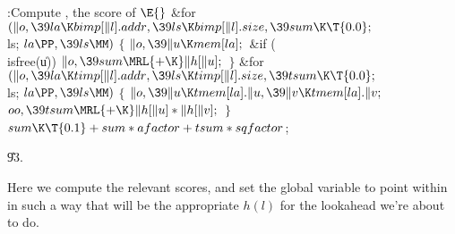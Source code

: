 \B{}:Compute , the score of \X${}%
\E{}$\6
\&{for} ${}(\|o,\39\\{la}\K\\{bimp}[\|l].\\{addr},\39\\{ls}\K\\{bimp}[\|l].%
\\{size},\39\\{sum}\K\T{0.0};{}$ \\{ls}; ${}\\{la}\PP,\39\\{ls}\MM){}$\5
${}\{{}$\1\6
${}\|o,\39\|u\K\\{mem}[\\{la}];{}$\6
\&{if} (\\{isfree}(\|u))\1\5
${}\|o,\39\\{sum}\MRL{+{\K}}\|h[\|u];{}$\2\6
\4${}\}{}$\2\6
\&{for} ${}(\|o,\39\\{la}\K\\{timp}[\|l].\\{addr},\39\\{ls}\K\\{timp}[\|l].%
\\{size},\39\\{tsum}\K\T{0.0};{}$ \\{ls}; ${}\\{la}\PP,\39\\{ls}\MM){}$\5
${}\{{}$\1\6
${}\|o,\39\|u\K\\{tmem}[\\{la}].\|u,\39\|v\K\\{tmem}[\\{la}].\|v;{}$\6
${}\\{oo},\39\\{tsum}\MRL{+{\K}}\|h[\|u]*\|h[\|v];{}$\6
\4${}\}{}$\2\6
${}\\{sum}\K\T{0.1}+\\{sum}*\\{afactor}+\\{tsum}*\\{sqfactor}{}$;\par
\U93.\fi

Here we compute the relevant scores, and set the global
variable 
to point within  in such a way that  will be the
appropriate $h(l)$ for the lookahead we're about to do.

